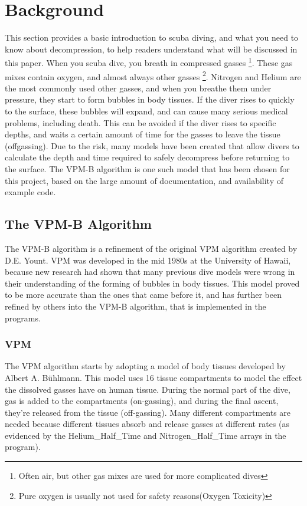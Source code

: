 \documentclass[12pt]{article}
\begin{document}
\section{Background}

This section provides a basic introduction to scuba diving, and what you need to know about decompression, to
help readers understand what will be discussed in this paper. 
When you scuba dive, you breath in compressed gasses \footnote{Often air, but other gas mixes are used
for more complicated dives}. These gas mixes contain oxygen, and almost always other gasses \footnote{Pure oxygen
is usually not used for safety reasons(Oxygen Toxicity)}. Nitrogen and Helium are the most commonly used
other gasses, and when you breathe them under pressure, they start to form bubbles in body tissues. If the diver rises to quickly to the surface, these bubbles will expand, and can cause many serious medical problems, including death. This can
be avoided if the diver rises to specific depths, and waits a certain amount of time for the gasses to leave the
tissue (offgassing). Due to the risk, many models have been created that allow divers to calculate the depth and
time required to safely decompress before returning to the surface. The VPM-B algorithm is one such model that
has been chosen for this project, based on the large amount of documentation, and availability of example code.

\subsection{The VPM-B Algorithm}

 The VPM-B algorithm is a refinement of the original VPM algorithm created by D.E. Yount. VPM was developed
in the mid 1980s at the University of Hawaii, because new research had shown that many previous dive models
were wrong in their understanding of the forming of bubbles in body tissues\cite{yount86}. This model
proved to be more accurate than the ones that came before it, and has further been refined by others
into the VPM-B algorithm, that is implemented in the programs.

\subsubsection{VPM}
 The VPM algorithm starts by adopting a model of body tissues developed by Albert A. B\"uhlmann. This model
uses 16 tissue compartments to model the effect the dissolved gasses have on human tissue. During the
normal part of the dive, gas is added to the compartments\cite{Buhlmann84} (on-gassing), and during the final ascent,
they're released from the tissue (off-gassing). Many different compartments are needed because different
tissues absorb and release gasses at different rates (as evidenced by the Helium\_Half\_Time and
Nitrogen\_Half\_Time arrays in the program).
\end{document}

